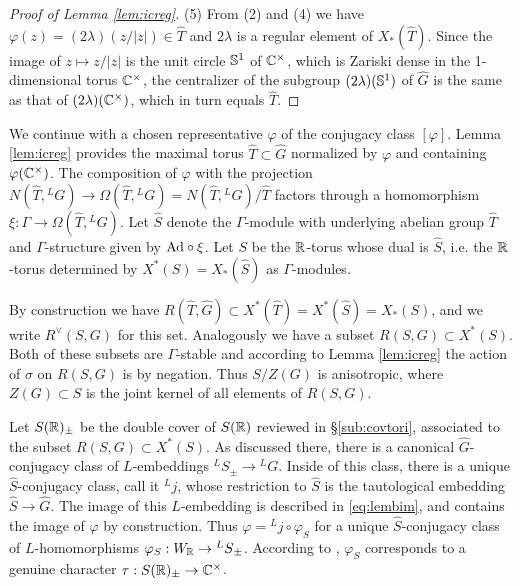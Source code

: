 \documentclass{article}
\theoremstyle{definition}
\numberwithin{equation}{section}
\renewcommand{\-}{\hyp{}}
\begin{document}
\begin{proof}[Proof of Lemma \ref{lem:icreg}]
(5) From (2) and (4) we have $\varphi(z)=(2\lambda)(z/|z|) \in \hat T$ and $2\lambda$ is a regular element of $X_*(\hat T)$. Since the image of $z \mapsto z/|z|$ is the unit circle $\mathbb{S}^1$ of $\mathbb{C}^\times$, which is Zariski dense in the 1-dimensional torus $\mathbb{C}^\times$, the centralizer of the subgroup $(2\lambda)(\mathbb{S}^1)$ of $\hat G$ is the same as that of $(2\lambda)(\mathbb{C}^\times)$, which in turn equals $\hat T$.
\end{proof}

We continue with a chosen representative $\varphi$ of the conjugacy class $[\varphi]$. Lemma \ref{lem:icreg} provides the maximal torus $\hat T \subset \hat G$ normalized by $\varphi$ and containing $\varphi(\mathbb{C}^\times)$.
%
%
The composition of $\varphi$ with the projection $N(\hat T,{^LG}) \to \Omega(\hat T,{^LG})=N(\hat T,{^LG})/\hat T$ factors through a homomorphism $\xi : \Gamma \to \Omega(\hat T,{^LG})$. Let $\hat S$ denote the $\Gamma$-module with underlying abelian group $\hat T$ and $\Gamma$-structure given by $\textrm{Ad}\circ\xi$. Let $S$ be the $\mathbb{R}$-torus whose dual is $\hat S$, i.e. the $\mathbb{R}$-torus determined by $X^*(S)=X_*(\hat S)$ as $\Gamma$-modules.


By construction we have $R(\hat T,\hat G) \subset X^*(\hat T)=X^*(\hat S)=X_*(S)$, and we write $R^\vee(S,G)$ for this set. Analogously we have a subset $R(S,G) \subset X^*(S)$. Both of these subsets are $\Gamma$-stable and according to Lemma \ref{lem:icreg} the action of $\sigma$ on $R(S,G)$ is by negation. Thus $S/Z(G)$ is anisotropic, where $Z(G) \subset S$ is the joint kernel of all elements of $R(S,G)$.

Let $S(\mathbb{R})_\pm$ be the double cover of $S(\mathbb{R})$ reviewed in \S\ref{sub:covtori}, associated to the subset $R(S,G) \subset X^*(S)$. As discussed there, there is a canonical $\hat G$-conjugacy class of $L$\-embeddings $^LS_\pm \to {^LG}$. Inside of this class, there is a unique $\hat S$-conjugacy class, call it $^Lj$, whose restriction to $\hat S$ is the tautological embedding $\hat S \to \hat G$. The image of this $L$\-embedding is described in \eqref{eq:lembim}, and contains the image of $\varphi$ by construction. Thus $\varphi = {^Lj}\circ\varphi_S$ for a unique $\hat S$-conjugacy class of $L$\-homomorphisms $\varphi_S : W_{\mathbb{R}} \to {^LS}_\pm$. According to \cite[Theorem 3.15]{KalDC}, $\varphi_S$ corresponds to a genuine character $\tau : S(\mathbb{R})_\pm \to \mathbb{C}^\times$.
\end{document}
